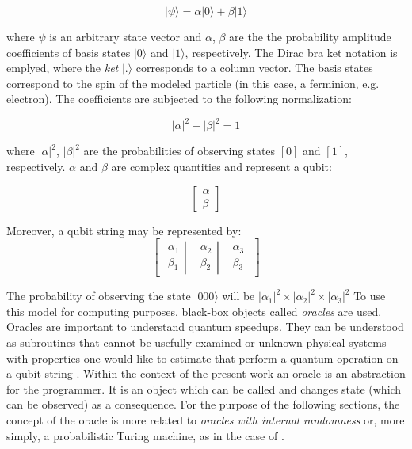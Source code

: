 $$
| \psi \rangle = \alpha | 0 \rangle + \beta | 1 \rangle
$$

where $\psi$ is an arbitrary state vector and $\alpha$, $\beta$ are the the probability amplitude coefficients of basis states $| 0 \rangle$ and $| 1 \rangle$, respectively.
The Dirac bra ket notation is emplyed, where the \emph{ket} $| . \rangle$ corresponds to a column vector.
The basis states correspond to the spin of the modeled particle (in this case, a ferminion, e.g. electron).
The coefficients are subjected to the following normalization:

$$|\alpha|^2 + |\beta|^2 = 1$$

where $|\alpha|^2$, $|\beta|^2$ are the probabilities of observing states $[0]$ and $[1]$, respectively. $\alpha$ and $\beta$ are complex quantities and represent a qubit:

$$\begin{bmatrix}
\alpha \\
\beta
\end{bmatrix}$$

Moreover, a qubit string may be represented by:
$$
\begin{bmatrix}
\left. \begin{matrix}
\alpha_1\\ 
\beta_1
\end{matrix}\right| & \left.\begin{matrix}
\alpha_2\\ 
\beta_2
\end{matrix}\right| & \begin{matrix}
\alpha_3\\ 
\beta_3
\end{matrix}
\end{bmatrix}
$$

The probability of observing the state $|000 \rangle$ will be $|\alpha_1|^2 \times |\alpha_2|^2 \times |\alpha_3|^2$
To use this model for computing purposes, black-box objects called \emph{oracles} are used.
Oracles are important to understand quantum speedups.
They can be understood as subroutines that cannot be usefully examined or unknown physical systems with properties one would like to estimate that perform a quantum operation on a qubit string \cite{Rosenbaum2011}.
Within the context of the present work an oracle is an abstraction for the programmer.
It is an object which can be called and changes state (which can be observed) as a consequence.
For the purpose of the following sections, the concept of the oracle is more related to \emph{oracles with internal randomness} \cite{Rosenbaum2011} or, more simply, a probabilistic Turing machine, as in the case of \cite{hung2013quantum}.

